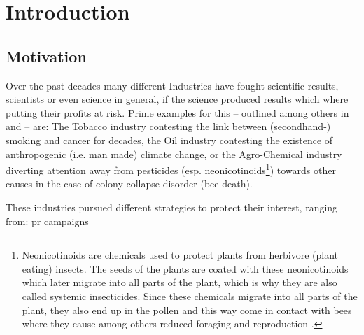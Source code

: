 \section{Introduction}
\label{sec:intro}

\subsection{Motivation}
Over the past decades many different Industries have fought scientific results, scientists or even science in general, if the science produced results which where putting their profits at risk. Prime examples for this -- outlined among others in \citet{oreskes_merchants_2010} and \citet{cuveillier_forschung_2020} -- are: The Tobacco industry contesting the link between (secondhand-) smoking and cancer for decades, the Oil industry contesting the existence of anthropogenic (i.e. man made) climate change, or the Agro-Chemical industry diverting attention away from pesticides (esp. neonicotinoids\footnote{Neonicotinoids are chemicals used to protect plants from herbivore (plant eating) insects. The seeds of the plants are coated with these neonicotinoids which later migrate into all parts of the plant, which is why they are also called systemic insecticides. Since these chemicals migrate into all parts of the plant, they also end up in the pollen and this way come in contact with bees where they cause among others reduced foraging and reproduction \citep{whitehorn_neonicotinoid_2012}.}) towards other causes in the case of colony collapse disorder (bee death). 

These industries pursued different strategies to protect their interest, ranging from: \gls{pr} campaigns

\newpage

